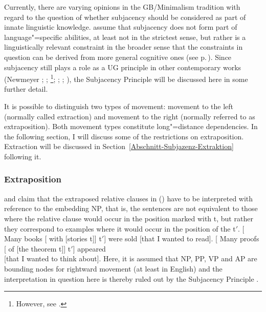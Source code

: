 \addlines
Currently, there are varying opinions in the GB/Minimalism tradition with regard to the question of
whether subjacency should be considered as part of innate linguistic knowledge. \citet*{HCF2002a}
assume that subjacency does not form part of language"=specific abilities, at least not in the
strictest sense, but rather is a linguistically relevant constraint in the broader sense that the
constraints in question can be derived from more general cognitive ones (see
p.\,\pageref{Seite-Subjazenz-Performanz}). Since subjacency still plays a role as a UG principle in
other contemporary works (Newmeyer \citeyear[, 74--75]{Newmeyer2005a}; \citeyear[]{Newmeyer2004b}; 
\citealp{Baltin2006a}\footnote{%
However, see .
}; \citealp{Baker2009a}; \citealp{Freidin2009a}; \citealp{Rizzi2009a,Rizzi2009b}), 
the Subjacency Principle will be discussed here in some further detail.

It is possible to distinguish two types of movement: movement to the left (normally called
extraction) and movement to the right (normally referred to as
extraposition). Both movement types constitute long"=distance dependencies. In the
following section, I will discuss some of the restrictions on extraposition. Extraction will be
discussed in Section~\ref{Abschnitt-Subjazenz-Extraktion} following it. 

\subsubsection{Extraposition}

\mbox{}\citet{Baltin81a} and \citet[]{Chomsky86b} claim that the extraposed relative clauses in () have to be interpreted with
reference to the embedding NP, that is, the sentences are not equivalent to those where the relative clause would occur in the position marked with t, but rather
they correspond to examples where it would occur in the position of the t$'$.
\eal
\label{ex-chomsky-sub}
\ex {}[ Many books [ with [stories t]] t$'$]  were sold [that I wanted to read].
\ex {}[ Many proofs [ of [the theorem t]] t$'$] appeared\\
    {}[that I wanted to think about].
\zl
Here, it is assumed that NP, PP, VP and AP are bounding nodes for rightward movement (at least in English) and the interpretation in question here
is thereby ruled out by the Subjacency Principle \citep[]{Baltin81a}. 

